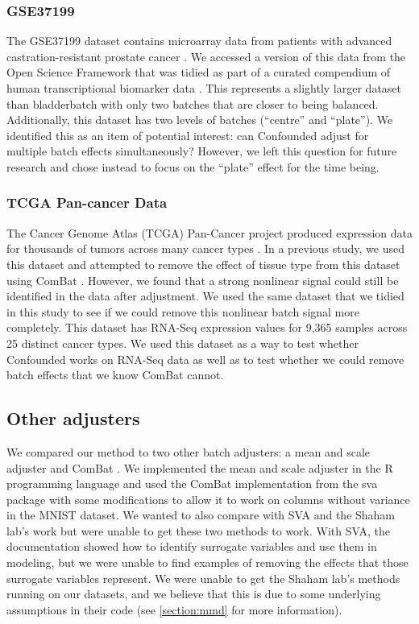 \documentclass[notitlepage]{article}
\begin{document}
\subsubsection{GSE37199}

The GSE37199 dataset contains microarray data from patients with advanced castration-resistant prostate cancer \cite{olmos_prognostic_2012}.
We accessed a version of this data from the Open Science Framework that was tidied as part of a curated compendium of human transcriptional biomarker data \cite{golightly_curated_2018}.
This represents a slightly larger dataset than bladderbatch with only two batches that are closer to being balanced.
Additionally, this dataset has two levels of batches (``centre'' and ``plate'').
We identified this as an item of potential interest: can Confounded adjust for multiple batch effects simultaneously?
However, we left this question for future research and chose instead to focus on the ``plate'' effect for the time being.

\subsubsection{TCGA Pan-cancer Data}

The Cancer Genome Atlas (TCGA) Pan-Cancer project produced expression data for thousands of tumors across many cancer types \cite{the_cancer_genome_atlas_research_network_cancer_2013}.
In a previous study, we used this dataset and attempted to remove the effect of tissue type from this dataset using ComBat \cite{dayton_classifying_2017-1}.
However, we found that a strong nonlinear signal could still be identified in the data after adjustment.
We used the same dataset that we tidied in this study to see if we could remove this nonlinear batch signal more completely.
This dataset has RNA-Seq expression values for 9,365 samples across 25 distinct cancer types.
We used this dataset as a way to test whether Confounded works on RNA-Seq data as well as to test whether we could remove batch effects that we know ComBat cannot.

\subsection{Other adjusters}

We compared our method to two other batch adjusters: a mean and scale adjuster and ComBat \cite{johnson_adjusting_2007}.
We implemented the mean and scale adjuster in the R programming language \cite{r_core_team_r_2014} and used the ComBat implementation from the sva package \cite{leek_sva_2017} with some modifications to allow it to work on columns without variance in the MNIST dataset.
We wanted to also compare with SVA \cite{leek_capturing_2007} and the Shaham lab's work \cite{shaham_removal_2017,shaham_batch_2018} but were unable to get these two methods to work.
With SVA, the documentation showed how to identify surrogate variables and use them in modeling, but we were unable to find examples of removing the effects that those surrogate variables represent.
We were unable to get the Shaham lab's methods running on our datasets, and we believe that this is due to some underlying assumptions in their code (see \ref{section:mmd} for more information).
\end{document}
